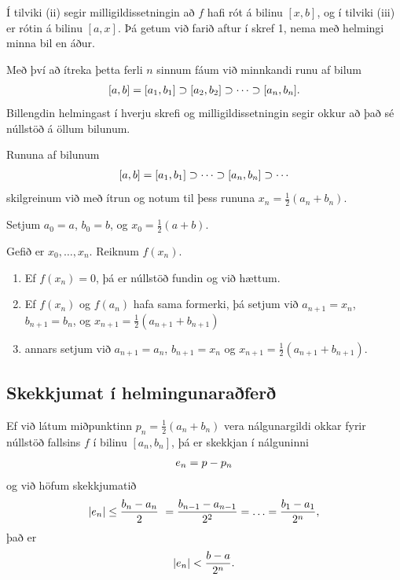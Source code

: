 \documentclass[A4paper,10pt,icelandic]{sphinxmanual}
\begin{document}
Í tilviki (ii) segir milligildissetningin að \(f\) hafi rót á bilinu
\([x,b]\), og í tilviki (iii) er rótin á bilinu \([a,x]\). Þá
getum við farið aftur í skref 1, nema með helmingi minna bil en áður.

Með því að ítreka þetta ferli \(n\) sinnum fáum við minnkandi runu
af bilum
\begin{gather}
\begin{split}[a,b]=[a_1,b_1]\supset [a_2,b_2]\supset \cdots\supset [a_n,b_n].\end{split}\notag
\end{gather}
Billengdin helmingast í hverju skrefi og milligildissetningin segir okkur að það sé núllstöð á öllum bilunum.

Rununa af bilunum
\begin{gather}
\begin{split}[a,b]= [a_1,b_1]\supset \cdots\supset [a_n,b_n]\supset \cdots\end{split}\notag
\end{gather}
skilgreinum við með ítrun og notum til þess rununa \(x_n=\frac 12(a_n+b_n)\).

Setjum \(a_0=a\), \(b_0=b\), og \(x_0=\frac 12(a+b)\).

Gefið er \(x_0,\dots,x_n\). Reiknum \(f(x_n)\).
\begin{enumerate}
\item {} 
Ef \(f(x_n) = 0\), þá er núllstöð fundin og við hættum.

\item {} 
Ef \(f(x_n)\) og \(f(a_n)\) hafa sama formerki, þá setjum við \(a_{n+1}=x_n\), \(b_{n+1}=b_n\), og  \(x_{n+1}=\frac 12(a_{n+1}+b_{n+1})\)

\item {} 
annars setjum við \(a_{n+1}=a_n\), \(b_{n+1}=x_n\) og \(x_{n+1}=\frac 12(a_{n+1}+b_{n+1})\).

\end{enumerate}


\subsection{Skekkjumat í helmingunaraðferð}
\label{kafli02:skekkjumat-i-helmingunarafer}
Ef við látum miðpunktinn \(p_n=\frac 12(a_n+b_n)\) vera
nálgunargildi okkar fyrir núllstöð fallsins \(f\) í bilinu
\([a_n,b_n]\), þá er skekkjan í nálguninni
\begin{gather}
\begin{split}e_n=p-p_n\end{split}\notag
\end{gather}
og við höfum skekkjumatið
\begin{gather}
\begin{split}|e_n|\leq  \dfrac{b_n - a_n}{2}\
= \frac{b_{n-1}-a_{n-1}}{2^2} = \ldots = \dfrac{b_1-a_1}{2^{n}},\end{split}\notag
\end{gather}
það er
\begin{gather}
\begin{split}|e_n| < \dfrac{b-a}{2^{n}}.\end{split}\notag
\end{gather}
\end{document}
